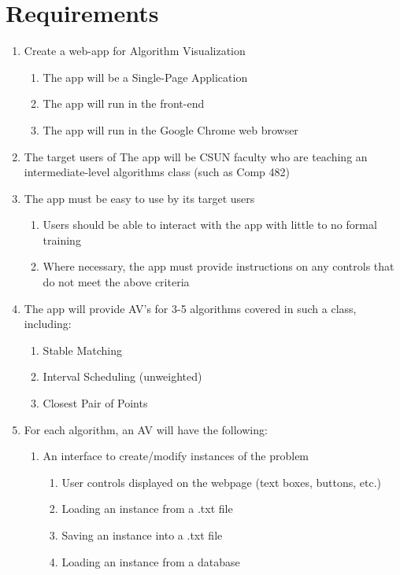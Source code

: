 \section{Requirements}
\label{requirements}
\begin{enumerate}
	\item Create a web-app for Algorithm Visualization 
	\begin{enumerate}
		\item The app will be a Single-Page Application
		\item The app will run in the front-end 
		\item The app will run in the Google Chrome web browser
	\end{enumerate}
	\item The target users of The app will be CSUN faculty 
	who are teaching an intermediate-level 
	algorithms class (such as Comp 482)
	\item The app must be easy to use by its target users
	\begin{enumerate}
		\item Users should be able to interact with the app with 
			little to no formal training
		\item Where necessary, the app must provide instructions on 
			any controls that do not meet the above criteria
	\end{enumerate}
	\item The app will provide AV's for 3-5 algorithms 
		covered in such a class, including: 
		\begin{enumerate}
			\item Stable Matching
			\item Interval Scheduling (unweighted)
			\item Closest Pair of Points
		\end{enumerate}
	\item For each algorithm, an AV will have the following:
	\begin{enumerate}
		\item An interface to create/modify instances of the problem
		\begin{enumerate}
			\item User controls displayed on the webpage (text boxes, buttons, etc.)
			\item Loading an instance from a .txt file
			\item Saving an instance into a .txt file
			\item Loading an instance from a database
		\end{enumerate}

\end{enumerate}
\end{enumerate}
